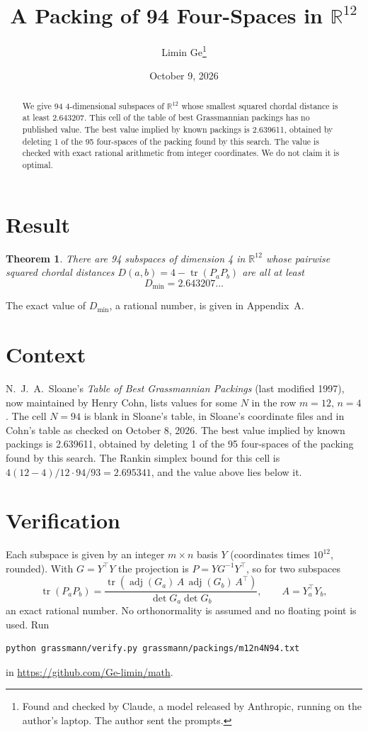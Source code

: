 \documentclass[11pt,a4paper]{article}
\title{A Packing of 94 Four-Spaces in $\mathbb{R}^{12}$}
\author{Limin Ge\thanks{Found and checked by Claude, a model released by Anthropic, running on the author's laptop. The author sent the prompts.}}
\date{October 9, 2026}
\newtheorem*{theorem}{Theorem}
\begin{document}
\maketitle
\begin{abstract}
We give 94 4-dimensional subspaces of $\mathbb{R}^{12}$ whose smallest squared chordal distance is at least 2.643207. This cell of the table of best Grassmannian packings has no published value. The best value implied by known packings is 2.639611, obtained by deleting 1 of the 95 four-spaces of the packing found by this search. The value is checked with exact rational arithmetic from integer coordinates. We do not claim it is optimal.
\end{abstract}

\section{Result}
\begin{theorem}
There are 94 subspaces of dimension 4 in $\mathbb{R}^{12}$ whose pairwise squared chordal distances $D(a,b) = 4 - \operatorname{tr}(P_aP_b)$ are all at least
\[ D_{\min} = 2.643207\ldots \]
\end{theorem}
The exact value of $D_{\min}$, a rational number, is given in Appendix~A.


\section{Context}
N.~J.~A.~Sloane's \emph{Table of Best Grassmannian Packings} (last modified 1997), now maintained by Henry Cohn, lists values for some $N$ in the row $m=12$, $n=4$. The cell $N=94$ is blank in Sloane's table, in Sloane's coordinate files and in Cohn's table as checked on October 8, 2026. The best value implied by known packings is 2.639611, obtained by deleting 1 of the 95 four-spaces of the packing found by this search. The Rankin simplex bound for this cell is $4(12-4)/12\cdot 94/93 = 2.695341$, and the value above lies below it.


\section{Verification}
Each subspace is given by an integer $m\times n$ basis $Y$ (coordinates times $10^{12}$, rounded). With $G=Y^\top Y$ the projection is $P=YG^{-1}Y^\top$, so for two subspaces
\[ \operatorname{tr}(P_aP_b)=\frac{\operatorname{tr}(\operatorname{adj}(G_a)\,A\,\operatorname{adj}(G_b)\,A^\top)}{\det G_a\det G_b},\qquad A=Y_a^\top Y_b, \]
an exact rational number. No orthonormality is assumed and no floating point is used. Run
\begin{verbatim}
python grassmann/verify.py grassmann/packings/m12n4N94.txt
\end{verbatim}
in \url{https://github.com/Ge-limin/math}.
\end{document}

